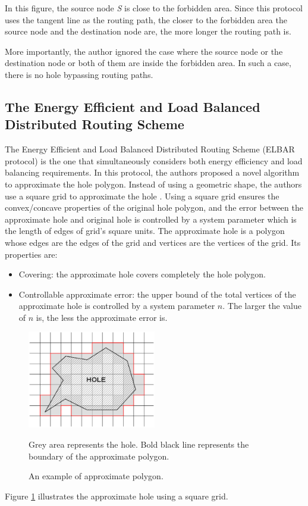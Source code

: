 In this figure, the source node \emph{S} is close to the forbidden area. Since this protocol uses the tangent line as the routing path, the closer to the forbidden area the source node and the destination node are, the more longer the routing path is.

More importantly, the author ignored the case where the source node or the destination node or both of them are inside the forbidden area. In such a case, there is no hole bypassing routing paths.

\subsection{The Energy Efficient and Load Balanced Distributed Routing Scheme}
The Energy Efficient and Load Balanced Distributed Routing Scheme (ELBAR protocol) is the one that simultaneously considers both energy efficiency and load balancing requirements. 
In this protocol, the authors proposed a novel algorithm to approximate the hole polygon. Instead of using a geometric shape, the authors use a square grid to approximate the hole \cite{gridoffline}. Using a square grid ensures the convex/concave properties of the original hole polygon, and the error between the approximate hole and original hole is controlled by a system parameter which is the length of edges of grid's square units. The approximate hole is a polygon whose edges are the edges of the grid and vertices are the vertices of the grid. Its properties are:
\begin{itemize}
\item Covering: the approximate hole covers completely the hole polygon.
\item Controllable approximate error: the upper bound of the total vertices of the approximate hole is controlled by a system parameter $n$. The larger the value of $n$ is, the less the approximate error is.
\end{itemize}

\begin{figure}[!htb]
\centering
\includegraphics[width=0.5\textwidth]{Chapter3/Chapter3Figs/fig-elbar-grid.eps}
\caption{An example of approximate polygon.}
\label{fig-elbar-grid}
\small{Grey area represents the hole. Bold black line represents the boundary of the approximate polygon.}
\end{figure}
Figure \ref{fig-elbar-grid} illustrates the approximate hole using a square grid.

